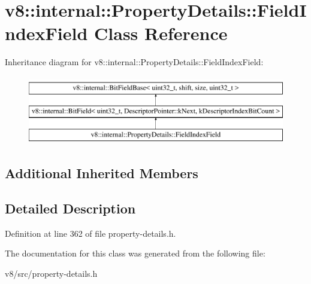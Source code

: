 \hypertarget{classv8_1_1internal_1_1PropertyDetails_1_1FieldIndexField}{}\section{v8\+:\+:internal\+:\+:Property\+Details\+:\+:Field\+Index\+Field Class Reference}
\label{classv8_1_1internal_1_1PropertyDetails_1_1FieldIndexField}
Inheritance diagram for v8\+:\+:internal\+:\+:Property\+Details\+:\+:Field\+Index\+Field\+:\begin{figure}[H]
\begin{center}
\leavevmode
\includegraphics[height=3.000000cm]{classv8_1_1internal_1_1PropertyDetails_1_1FieldIndexField}
\end{center}
\end{figure}
\subsection*{Additional Inherited Members}


\subsection{Detailed Description}


Definition at line 362 of file property-\/details.\+h.



The documentation for this class was generated from the following file\+:\begin{DoxyCompactItemize}
\item 
v8/src/property-\/details.\+h\end{DoxyCompactItemize}
